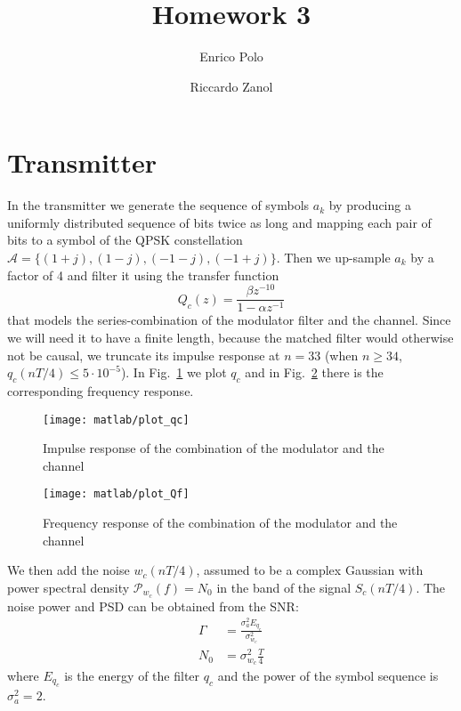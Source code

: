 \documentclass[a4paper,oneside]{article}
\author{Enrico Polo \and Riccardo Zanol}
\title{Homework 3}
\begin{document}
\maketitle
\section{Transmitter}
In the transmitter we generate the sequence of symbols $a_k$ by
producing a uniformly distributed sequence of bits twice as long and
mapping each pair of bits to a symbol of the QPSK constellation $
\mathcal{A} = \{(1+j),(1-j),(-1-j),(-1+j)\}$. Then we up-sample $a_k$
by a factor of 4 and filter it using the transfer function
\begin{equation}
  Q_c(z) = \frac{\beta z^{-10}}{1 - \alpha z^{-1}}
\end{equation}
that models the series-combination of the modulator filter and
  the channel.  Since we will need it to have a finite length,
because the matched filter would otherwise not be causal, we truncate
its impulse response at $n=33$ (when $n \geq 34$, $q_c(nT/4) \leq
5\cdot10^{-5}$). In Fig.~\ref{plot:qc} we plot $q_c$ and in
Fig.~\ref{plot:Qf} there is the corresponding frequency response.
\begin{figure}[htbp]
  \centering
  \texttt{[image: matlab/plot\_qc]}
  \caption{Impulse response of the combination of the modulator and
    the channel}
  \label{plot:qc}
\end{figure}
\begin{figure}[htbp]
  \centering
  \texttt{[image: matlab/plot\_Qf]}
  \caption{Frequency response of the combination of the modulator and
    the channel}
  \label{plot:Qf}
\end{figure}

We then add the noise $w_c(nT/4)$, assumed to be
a complex Gaussian with power spectral density $\mathcal{P}_{w_c}(f) =
N_0$ in the band of the signal $S_c(nT/4)$. The noise power and PSD
can be obtained from the SNR:
\begin{align}
  \Gamma &= \frac{\sigma^2_a E_{q_c}}{\sigma^2_{w_c}} \\
  N_0 &= \sigma^2_{w_c}\frac{T}{4}
\end{align}
where $E_{q_c}$ is the energy of the filter $q_c$ and the power of the
symbol sequence is $\sigma^2_a = 2$.
\end{document}
